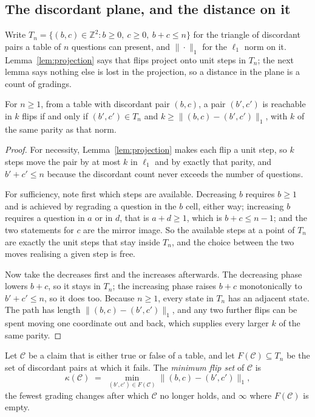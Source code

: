 \subsection{The discordant plane, and the distance on it}

Write $T_n = \{(b, c) \in \mathbb{Z}^2 : b \geq 0,\ c \geq 0,\ b + c \leq n\}$
for the triangle of discordant pairs a table of $n$ questions can present, and
$\|\cdot\|_1$ for the $\ell_1$ norm on it. Lemma~\ref{lem:projection} says that
flips project onto unit steps in $T_n$; the next lemma says nothing else is
lost in the projection, so a distance in the plane is a count of gradings.

\begin{lemma}\label{lem:metric}
For $n\geq 1$, from a table with discordant pair $(b, c)$, a pair $(b', c')$ is reachable in
$k$ flips if and only if $(b', c') \in T_n$ and
$k \geq \|(b, c) - (b', c')\|_1$, with $k$ of the same parity as that norm.
\end{lemma}

\begin{proof}
For necessity, Lemma~\ref{lem:projection} makes each flip a unit step, so $k$
steps move the pair by at most $k$ in $\ell_1$ and by exactly that parity, and
$b' + c' \leq n$ because the discordant count never exceeds the number of
questions.

For sufficiency, note first which steps are available. Decreasing $b$ requires
$b \geq 1$ and is achieved by regrading a question in the $b$ cell, either way;
increasing $b$ requires a question in $a$ or in $d$, that is $a + d \geq 1$,
which is $b + c \leq n - 1$; and the two statements for $c$ are the mirror
image. So the available steps at a point of $T_n$ are exactly the unit steps
that stay inside $T_n$, and the choice between the two moves realising a given
step is free.

Now take the decreases first and the increases afterwards. The decreasing phase
lowers $b + c$, so it stays in $T_n$; the increasing phase raises $b + c$
monotonically to $b' + c' \leq n$, so it does too. Because $n\geq1$, every
state in $T_n$ has an adjacent state. The path has length
$\|(b, c) - (b', c')\|_1$, and any two further flips can be spent moving one
coordinate out and back, which supplies every larger $k$ of the same parity.
\end{proof}

\begin{definition}\label{def:mfs}
Let $\mathcal{C}$ be a claim that is either true or false of a table, and let
$F(\mathcal{C}) \subseteq T_n$ be the set of discordant pairs at which it fails.
The \emph{minimum flip set} of $\mathcal{C}$ is
\begin{equation}\label{eq:mfs}
  \kappa(\mathcal{C}) \;=\; \min_{(b', c') \in F(\mathcal{C})}
    \bigl\| (b, c) - (b', c') \bigr\|_1,
\end{equation}
the fewest grading changes after which $\mathcal{C}$ no longer holds, and
$\infty$ where $F(\mathcal{C})$ is empty.
\end{definition}

